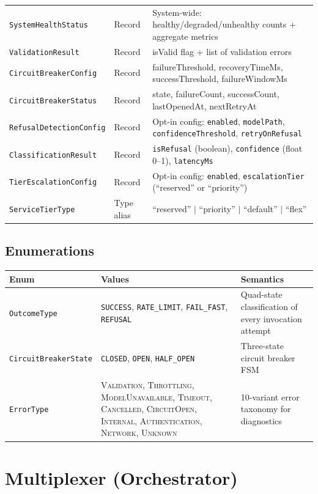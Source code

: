 \documentclass[10pt,letterpaper]{article}
\newcommand{\op}[1]{\textsc{#1}}
\newcommand{\cls}[1]{\texttt{#1}}
\newcommand{\fld}[1]{\texttt{#1}}
\begin{document}
\begin{tabular}{@{}l l p{7.5cm}@{}}
\cls{SystemHealthStatus} & Record & System-wide: healthy/degraded/unhealthy counts + aggregate metrics \\
\cls{ValidationResult} & Record & isValid flag + list of validation errors \\
\cls{CircuitBreakerConfig} & Record & failureThreshold, recoveryTimeMs, successThreshold, failureWindowMs \\
\cls{CircuitBreakerStatus} & Record & state, failureCount, successCount, lastOpenedAt, nextRetryAt \\
\cls{RefusalDetectionConfig} & Record & Opt-in config: \fld{enabled}, \fld{modelPath}, \fld{confidenceThreshold}, \fld{retryOnRefusal} \\
\cls{ClassificationResult} & Record & \fld{isRefusal} (boolean), \fld{confidence} (float 0--1), \fld{latencyMs} \\
\cls{TierEscalationConfig} & Record & Opt-in config: \fld{enabled}, \fld{escalationTier} (``reserved'' or ``priority'') \\
\cls{ServiceTierType} & Type alias & ``reserved'' $|$ ``priority'' $|$ ``default'' $|$ ``flex'' \\
\bottomrule
\end{tabular}

\subsection*{{\color{typepurple}Enumerations}}

\begin{tabular}{@{}l l p{7.5cm}@{}}
\toprule
\textbf{Enum} & \textbf{Values} & \textbf{Semantics} \\
\midrule
\cls{OutcomeType} & \texttt{SUCCESS}, \texttt{RATE\_LIMIT}, \texttt{FAIL\_FAST}, \texttt{REFUSAL} & Quad-state classification of every invocation attempt \\
\cls{CircuitBreakerState} & \texttt{CLOSED}, \texttt{OPEN}, \texttt{HALF\_OPEN} & Three-state circuit breaker FSM \\
\cls{ErrorType} & \op{Validation}, \op{Throttling}, \op{ModelUnavailable}, \op{Timeout}, \op{Cancelled}, \op{CircuitOpen}, \op{Internal}, \op{Authentication}, \op{Network}, \op{Unknown} & 10-variant error taxonomy for diagnostics \\
\bottomrule
\end{tabular}

\section*{{\color{coreblue}Multiplexer (Orchestrator)}}
\end{document}
